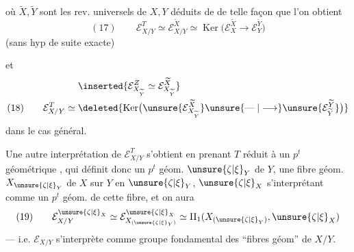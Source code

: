
où $\widetilde X,\widetilde Y$ sont les rev. universels de $X,Y$ déduits de  de telle façon que l'on obtient
\[
(17)\qquad \mathcal E_{X/Y}^T\simeq\mathcal E_{X/Y}^{\widetilde X}\simeq\operatorname{Ker}\bigl(\mathcal E_X^{\widetilde X}\longrightarrow\mathcal E_Y^{\widetilde Y}\bigr)
\]
(sans hyp de suite exacte)

et
\[
\begin{aligned}
&\inserted{\mathcal E_{X_{\widetilde Y}}^Z\simeq\mathcal E_{X_{\widetilde Y}}^{\widetilde X}}\\
(18)\qquad \mathcal E_{X/Y}^T\simeq{}&\deleted{\operatorname{Ker}\bigl(\unsure{\mathcal E_{X_{\widetilde Y}}^{\widetilde X}}\unsure{\mathrel{\text{---}}|\longrightarrow}\unsure{\mathcal E_{\widetilde Y}^{\widetilde Y}}\bigr)}
\end{aligned}
\]
dans le cas général.


Une autre interprétation de $\mathcal E_{X/Y}^T$ s'obtient en prenant $T$ réduit à un $p^t$ géométrique , qui définit donc un $p^t$ géom. $\unsure{\zeta|\xi}_Y$ de $Y$, une fibre géom. $X_{\unsure{\zeta|\xi}_Y}$ de $X$ sur $Y$ en $\unsure{\zeta|\xi}_Y$, $\unsure{\zeta|\xi}_X$ s'interprétant comme un $p^t$ géom. de cette fibre, et on aura
\[
(19)\qquad \mathcal E_{X/Y}^{\unsure{\zeta|\xi}_X}\simeq\mathcal E_{X_{(\unsure{\zeta|\xi}_Y)}}^{\unsure{\zeta|\xi}_X}\simeq\Pi_1(X_{(\unsure{\zeta|\xi}_Y)},\unsure{\zeta|\xi}_X)
\]
--- i.e. $\mathcal E_{X/Y}$ s'interprète comme groupe fondamental des ``fibres géom'' de $X/Y$.

